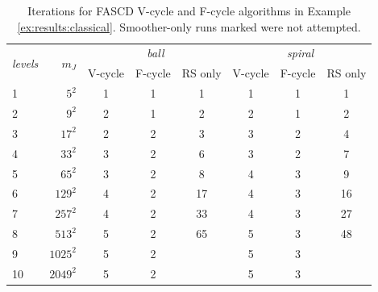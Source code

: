 \documentclass[letterpaper,final,12pt,reqno]{amsart}
\theoremstyle{cstyle}
\theoremstyle{cstyle*}
\theoremstyle{dstyle}
\numberwithin{equation}{section}
\numberwithin{figure}{section}
\numberwithin{table}{section}
\numberwithin{theorem}{section}
\newcommand{\XX}{\ding{55}}
\begin{document}
\begin{table}[ht]
\begin{tabular}{lr@{\hskip 7mm}cccccc}
\multirow{2}{*}{\emph{levels}} & \multirow{2}{*}{$m_J$} & \multicolumn{3}{c}{\,\emph{ball}} & \multicolumn{3}{c}{\,\emph{spiral}} \\ \cmidrule(lr){3-5} \cmidrule(lr){6-8}
   &          & V-cycle & F-cycle & RS only & V-cycle & F-cycle & RS only \\ \cmidrule{1-8}
 1 &    $5^2$ &  1 &  1 &  1  &  1 &  1 &  1 \\
 2 &    $9^2$ &  2 &  1 &  2  &  2 &  1 &  2 \\
 3 &   $17^2$ &  2 &  2 &  3  &  3 &  2 &  4 \\
 4 &   $33^2$ &  3 &  2 &  6  &  3 &  2 &  7 \\
 5 &   $65^2$ &  3 &  2 &  8  &  4 &  3 &  9 \\
 6 &  $129^2$ &  4 &  2 & 17  &  4 &  3 & 16 \\
 7 &  $257^2$ &  4 &  2 & 33  &  4 &  3 & 27 \\
 8 &  $513^2$ &  5 &  2 & 65  &  5 &  3 & 48 \\
 9 & $1025^2$ &  5 &  2 & \XX &  5 &  3 & \XX \\
10 & $2049^2$ &  5 &  2 & \XX &  5 &  3 & \XX
\end{tabular}
\bigskip
\caption{Iterations for FASCD V-cycle and F-cycle algorithms in Example \ref{ex:results:classical}.  Smoother-only runs marked \XX\xspace were not attempted.}
\label{tab:results:classical}
\end{table}
\end{document}
